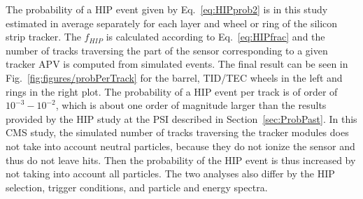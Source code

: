 The probability of a HIP event given by Eq.~\ref{eq:HIPprob2} is in this study estimated in average separately for each layer and wheel or ring of the silicon strip tracker.  The $f_{HIP}$ is calculated according to Eq.~\ref{eq:HIPfrac} and the number of tracks traversing the part of the sensor corresponding to a given tracker APV is computed from simulated events. The final result can be seen in Fig.~\ref{fig:figures/probPerTrack} for the barrel, TID/TEC wheels in the left and rings in the right plot. The probability of a HIP event per track is of order of $10^{-3}-10^{-2}$, which is about one order of magnitude larger than the results provided by the HIP study at the PSI described in Section~\ref{sec:ProbPast}. In this CMS study, the simulated number of tracks traversing the tracker modules does not take into account neutral particles, because they do not ionize the sensor and thus do not leave hits. Then the probability of the HIP event is thus increased by not taking into account all particles. The two analyses also differ by the HIP selection, trigger conditions, and particle and energy spectra.

